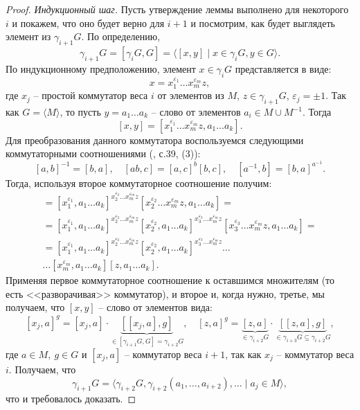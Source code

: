 \documentclass{article}
\begin{document}
\begin{proof}
    \textit{Индукционный шаг.} Пусть утверждение леммы выполнено для некоторого $i$ и покажем, что оно будет верно для $i + 1$ и посмотрим, как будет выглядеть элемент из $\gamma_{i + 1}G$. По определению, $$\gamma_{i + 1}G = [\gamma_i G, G] = \langle [x, y] \mid x \in \gamma_i G, y \in G \rangle. $$
    По индукционному предположению, элемент $x \in \gamma_i G$ представляется в виде: $$ x = x_1^{\varepsilon_1} \ldots x_m^{\varepsilon_m} z, $$ где $x_j$ -- простой коммутатор веса $i$ от элементов из $M$, $z \in \gamma_{i + 1}G$, $\varepsilon_j = \pm 1$.
    Так как $G = \langle M \rangle$, то пусть $y = a_1 \ldots a_k$ -- слово от элементов $a_i \in M \cup M^{-1}$.
    Тогда
    \[
        [x, y] = [x_1^{\varepsilon_1} \ldots x_m^{\varepsilon_m} z, a_1 \ldots a_k].
    \]
    Для преобразования данного коммутатора воспользуемся следующими коммутаторными соотношениями (\cite{kargapolov}, с.39, (3)):
    \[
        [a, b]^{-1} = [b, a], \quad [ab, c] = [a, c]^b [b, c], \quad [a^{-1}, b] = [b, a]^{a^{-1}}.
    \]
    Тогда, используя второе коммутаторное соотношение получим:
    \begin{multline*}
        [x, y] = [x_1^{\varepsilon_1}, a_1 \ldots a_k]^{x_2^{\varepsilon_2} \ldots x_m^{\varepsilon_m} z} [x_2^{\varepsilon_2} \ldots x_m^{\varepsilon_m} z, a_1 \ldots a_k] = \\
        = [x_1^{\varepsilon_1}, a_1 \ldots a_k]^{x_2^{\varepsilon_2} \ldots x_m^{\varepsilon_m} z} [x_2^{\varepsilon_2}, a_1 \ldots a_k]^{x_3^{\varepsilon_3} \ldots x_m^{\varepsilon_m} z} [x_3^{\varepsilon_3} \ldots x_m^{\varepsilon_m} z, a_1 \ldots a_k] = \\
        = [x_1^{\varepsilon_1}, a_1 \ldots a_k]^{x_2^{\varepsilon_2} \ldots x_m^{\varepsilon_m} z} [x_2^{\varepsilon_2}, a_1 \ldots a_k]^{x_3^{\varepsilon_3} \ldots x_m^{\varepsilon_m} z} \ldots \\
        \ldots [x_m^{\varepsilon_m}, a_1 \ldots a_k] [z, a_1 \ldots a_k].
    \end{multline*}
    Применяя первое коммутаторное соотношение к оставшимся множителям (то есть <<разворачивая>> коммутатор), и второе и, когда нужно, третье, мы получаем, что $[x, y]$ -- слово от элементов вида:
    \[
        [x_j, a]^g = [x_j, a] \cdot \underbrace{[[x_j, a], g]}_{\in [\gamma_{i + 1}G, G] = \gamma_{i + 2}G}, \quad [z, a]^g = \underbrace{[z, a]}_{\in \gamma_{i + 2}G} \cdot \underbrace{[[z, a], g]}_{\in \gamma_{i + 3}G \subseteq \gamma_{i + 2}G},
    \]
    где $a \in M, \ g \in G$ и $[x_j, a]$ -- коммутатор веса $i + 1$, так как $x_j$ -- коммутатор веса $i$.
    Получаем, что
    \[
        \gamma_{i + 1}G = \langle \gamma_{i + 2}G, \gamma_{i + 2}(a_1, \ldots, a_{i + 2}), \ldots \mid a_j \in M \rangle,
    \]
    что и требовалось доказать.
\end{proof}
\end{document}
